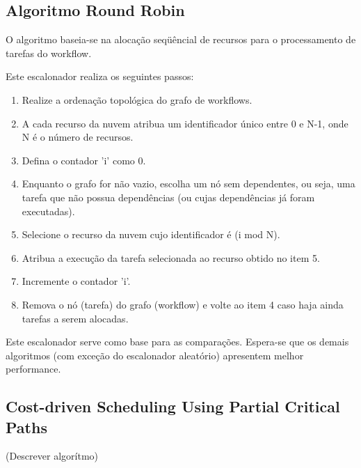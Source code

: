 \documentclass[a4paper,10pt]{article}
\begin{document}
\subsection{Algoritmo Round Robin}

O algoritmo baseia-se na alocação seqüêncial de recursos para o processamento de tarefas do workflow.

Este escalonador realiza os seguintes passos:

\begin{enumerate}

    \item Realize a ordenação topológica do grafo de workflows.

    \item A cada recurso da nuvem atribua um identificador único entre 0 e N-1, onde N é o número de recursos.

    \item Defina o contador 'i' como 0.

    \item Enquanto o grafo for não vazio, escolha um nó sem dependentes, ou seja, uma tarefa que não possua dependências 
(ou cujas dependências já foram executadas).

    \item Selecione o recurso da nuvem cujo identificador é (i mod N).

    \item Atribua a execução da tarefa selecionada ao recurso obtido no item 5.

    \item Incremente o contador 'i'.

    \item Remova o nó (tarefa) do grafo (workflow) e volte ao item 4 caso haja ainda tarefas a serem alocadas.

\end{enumerate}

Este escalonador serve como base para as comparações. Espera-se que os demais algoritmos (com exceção do escalonador
aleatório) apresentem melhor performance.

\subsection{Cost-driven Scheduling Using Partial Critical Paths}

(Descrever algorítmo)
\end{document}
